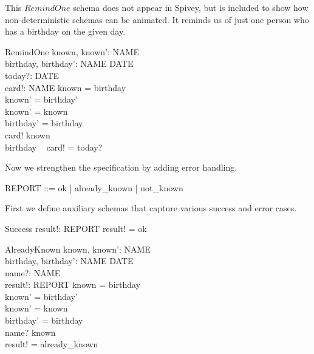 \documentclass{article}
\begin{document}

This $RemindOne$ schema does not appear in Spivey, but is
included to show how non-deterministic schemas can be animated.
It reminds us of just one person who has a birthday on the given 
day.
\begin{schema}{RemindOne}
    known, known': \power NAME \\
    birthday, birthday': NAME \pfun DATE \\
    today?: DATE \\
    card!: NAME
\where
    known = \dom birthday \\
    known' = \dom birthday' \\
    known' = known \\
    birthday' = birthday \\
    card! \in known \\
    birthday ~ card! = today?
\end{schema}


Now we strengthen the specification by adding error handling.

\begin{zed} 
    REPORT ::= ok | already\_known | not\_known
\end{zed}

First we define auxiliary schemas that capture various success
and error cases.

\begin{schema}{Success}
    result!: REPORT
\where
    result! = ok
\end{schema}

\begin{schema}{AlreadyKnown}
    known, known': \power NAME \\
    birthday, birthday': NAME \pfun DATE \\
    name?: NAME \\
    result!: REPORT
\where
    known = \dom birthday \\
    known' = \dom birthday' \\
    known' = known \\
    birthday' = birthday \\
    name? \in known \\
    result! = already\_known
\end{schema}
\end{document}
